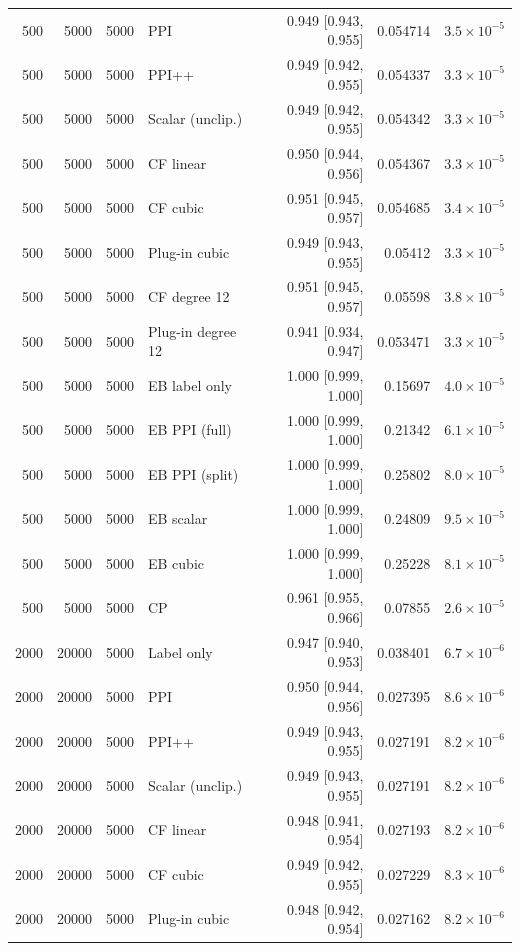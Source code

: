 {\begin{longtable}{rrrlrrr}
500 & 5000 & 5000 & PPI & 0.949 [0.943, 0.955] & 0.054714 & $3.5\times 10^{-5}$ \\
500 & 5000 & 5000 & PPI++ & 0.949 [0.942, 0.955] & 0.054337 & $3.3\times 10^{-5}$ \\
500 & 5000 & 5000 & Scalar (unclip.) & 0.949 [0.942, 0.955] & 0.054342 & $3.3\times 10^{-5}$ \\
500 & 5000 & 5000 & CF linear & 0.950 [0.944, 0.956] & 0.054367 & $3.3\times 10^{-5}$ \\
500 & 5000 & 5000 & CF cubic & 0.951 [0.945, 0.957] & 0.054685 & $3.4\times 10^{-5}$ \\
500 & 5000 & 5000 & Plug-in cubic & 0.949 [0.943, 0.955] & 0.05412 & $3.3\times 10^{-5}$ \\
500 & 5000 & 5000 & CF degree 12 & 0.951 [0.945, 0.957] & 0.05598 & $3.8\times 10^{-5}$ \\
500 & 5000 & 5000 & Plug-in degree 12 & 0.941 [0.934, 0.947] & 0.053471 & $3.3\times 10^{-5}$ \\
500 & 5000 & 5000 & EB label only & 1.000 [0.999, 1.000] & 0.15697 & $4.0\times 10^{-5}$ \\
500 & 5000 & 5000 & EB PPI (full) & 1.000 [0.999, 1.000] & 0.21342 & $6.1\times 10^{-5}$ \\
500 & 5000 & 5000 & EB PPI (split) & 1.000 [0.999, 1.000] & 0.25802 & $8.0\times 10^{-5}$ \\
500 & 5000 & 5000 & EB scalar & 1.000 [0.999, 1.000] & 0.24809 & $9.5\times 10^{-5}$ \\
500 & 5000 & 5000 & EB cubic & 1.000 [0.999, 1.000] & 0.25228 & $8.1\times 10^{-5}$ \\
500 & 5000 & 5000 & CP & 0.961 [0.955, 0.966] & 0.07855 & $2.6\times 10^{-5}$ \\
2000 & 20000 & 5000 & Label only & 0.947 [0.940, 0.953] & 0.038401 & $6.7\times 10^{-6}$ \\
2000 & 20000 & 5000 & PPI & 0.950 [0.944, 0.956] & 0.027395 & $8.6\times 10^{-6}$ \\
2000 & 20000 & 5000 & PPI++ & 0.949 [0.943, 0.955] & 0.027191 & $8.2\times 10^{-6}$ \\
2000 & 20000 & 5000 & Scalar (unclip.) & 0.949 [0.943, 0.955] & 0.027191 & $8.2\times 10^{-6}$ \\
2000 & 20000 & 5000 & CF linear & 0.948 [0.941, 0.954] & 0.027193 & $8.2\times 10^{-6}$ \\
2000 & 20000 & 5000 & CF cubic & 0.949 [0.942, 0.955] & 0.027229 & $8.3\times 10^{-6}$ \\
2000 & 20000 & 5000 & Plug-in cubic & 0.948 [0.942, 0.954] & 0.027162 & $8.2\times 10^{-6}$ \\

\end{longtable}}
